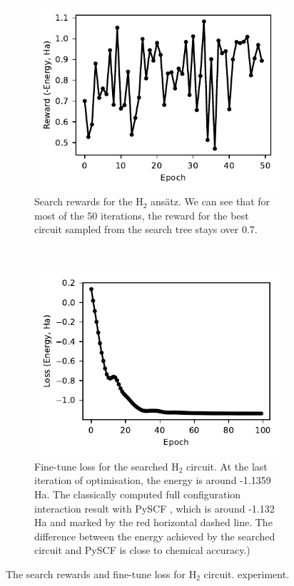 \documentclass{ieeeaccess}
\begin{document}
\begin{figure}[ht!]
    \centering
    \begin{subfigure}[t]{0.4\linewidth}
        \includegraphics[width=\linewidth]{peiyong_fig_9.pdf}
        \caption{Search rewards for the $\text{H}_2$ ans\"atz. We can see that for most of the 50 iterations, the reward for the best circuit sampled from the search tree stays over 0.7.}
        \label{fig:h2_search}
    \end{subfigure}
    ~ %
    \begin{subfigure}[t]{0.4\linewidth}
        \includegraphics[width=\linewidth]{peiyong_fig_10.pdf}
        \caption{Fine-tune loss for the searched $\text{H}_2$ circuit. At the last iteration of optimisation, the energy is around -1.1359 Ha. The classically computed full configuration interaction result with PySCF \cite{Sun2018-nq, Sun2020-ej}, which is around -1.132 Ha and marked by the red horizontal dashed line. The difference between the energy achieved by the searched circuit and PySCF is close to chemical accuracy.)}
        \label{fig:h2_finetune}
    \end{subfigure}
    \caption{The search rewards and fine-tune loss for $\text{H}_2$ circuit. experiment.}\label{fig:h2_search_finetune}
\end{figure}
\end{document}
